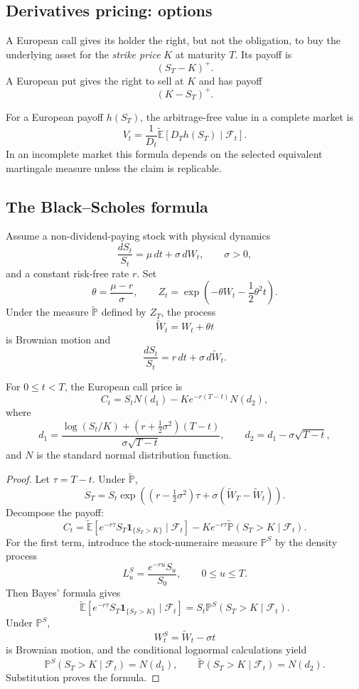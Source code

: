 \subsection{Derivatives pricing: options}

\begin{de}
A European call gives its holder the right, but not the obligation, to buy the underlying asset for the \emph{strike price} $K$ at maturity $T$. Its payoff is
\[
(S_T-K)^+.
\]
A European put gives the right to sell at $K$ and has payoff
\[
(K-S_T)^+.
\]
\end{de}

For a European payoff $h(S_T)$, the arbitrage-free value in a complete market is
\[
V_t
=\frac{1}{D_t}
 \widetilde{\mathbb{E}}[D_Th(S_T)\mid\mathcal{F}_t].
\]
In an incomplete market this formula depends on the selected equivalent martingale measure unless the claim is replicable.

\subsection{The Black--Scholes formula}

Assume a non-dividend-paying stock with physical dynamics
\[
\frac{dS_t}{S_t}=\mu\,dt+\sigma\,dW_t,
\qquad \sigma>0,
\]
and a constant risk-free rate $r$. Set
\[
\theta=\frac{\mu-r}{\sigma},
\qquad
Z_t=\exp\!\left(-\theta W_t-\frac12\theta^2t\right).
\]
Under the measure $\widetilde{\mathbb{P}}$ defined by $Z_T$, the process
\[
\widetilde W_t=W_t+\theta t
\]
is Brownian motion and
\[
\frac{dS_t}{S_t}=r\,dt+\sigma\,d\widetilde W_t.
\]

\begin{thm}
For $0\leq t<T$, the European call price is
\[
C_t=S_tN(d_1)-Ke^{-r(T-t)}N(d_2),
\]
where
\[
d_1
=\frac{\log(S_t/K)+(r+\frac12\sigma^2)(T-t)}
       {\sigma\sqrt{T-t}},
\qquad
d_2=d_1-\sigma\sqrt{T-t},
\]
and $N$ is the standard normal distribution function.
\end{thm}

\begin{proof}
Let $\tau=T-t$. Under $\widetilde{\mathbb{P}}$,
\[
S_T
=S_t\exp\!\left(
(r-\tfrac12\sigma^2)\tau
+\sigma(\widetilde W_T-\widetilde W_t)
\right).
\]
Decompose the payoff:
\[
C_t
=\widetilde{\mathbb{E}}\!\left[
 e^{-r\tau}S_T\mathbf{1}_{\{S_T>K\}}
 \mid\mathcal{F}_t
\right]
-Ke^{-r\tau}
 \widetilde{\mathbb{P}}(S_T>K\mid\mathcal{F}_t).
\]
For the first term, introduce the stock-numeraire measure $\mathbb{P}^S$ by the density process
\[
L_u^S=\frac{e^{-ru}S_u}{S_0},
\qquad 0\leq u\leq T.
\]
Then Bayes' formula gives
\[
\widetilde{\mathbb{E}}\!\left[
 e^{-r\tau}S_T\mathbf{1}_{\{S_T>K\}}
 \mid\mathcal{F}_t
\right]
=S_t\mathbb{P}^S(S_T>K\mid\mathcal{F}_t).
\]
Under $\mathbb{P}^S$,
\[
W_t^S=\widetilde W_t-\sigma t
\]
is Brownian motion, and the conditional lognormal calculations yield
\[
\mathbb{P}^S(S_T>K\mid\mathcal{F}_t)=N(d_1),
\qquad
\widetilde{\mathbb{P}}(S_T>K\mid\mathcal{F}_t)=N(d_2).
\]
Substitution proves the formula.
\end{proof}

